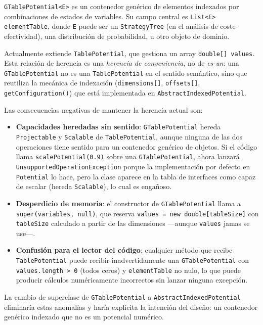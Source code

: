 \documentclass[11pt,a4paper]{article}
\newcommand{\code}[1]{\texttt{#1}}
\begin{document}
\code{GTablePotential<E>} es un contenedor genérico de elementos indexados
por combinaciones de estados de variables.  Su campo central es
\code{List<E> elementTable}, donde \code{E} puede ser un \code{StrategyTree}
(en el análisis de coste-efectividad), una distribución de probabilidad,
u otro objeto de dominio.

Actualmente extiende \code{TablePotential}, que gestiona un array
\code{double[]~values}.  Esta relación de herencia es una \emph{herencia de
conveniencia}, no de \emph{es-un}: una \code{GTablePotential} no es una
\code{TablePotential} en el sentido semántico, sino que reutiliza la
mecánica de indexación (\code{dimensions[]}, \code{offsets[]},
\code{getConfiguration()}) que está implementada en
\code{AbstractIndexedPotential}.

Las consecuencias negativas de mantener la herencia actual son:

\begin{itemize}
  \item \textbf{Capacidades heredadas sin sentido}: \code{GTablePotential}
        hereda \code{Projectable} y \code{Scalable} de \code{TablePotential},
        aunque ninguna de las dos operaciones tiene sentido para un contenedor
        genérico de objetos.  Si el código llama
        \code{scalePotential(0.9)} sobre una \code{GTablePotential},
        ahora lanzará \code{UnsupportedOperationException} porque la
        implementación por defecto en \code{Potential} lo hace, pero
        la clase aparece en la tabla de interfaces como capaz de escalar
        (hereda \code{Scalable}), lo cual es engañoso.

  \item \textbf{Desperdicio de memoria}: el constructor de
        \code{GTablePotential} llama a \code{super(variables, null)}, que
        reserva \code{values = new double[tableSize]} con
        \code{tableSize} calculado a partir de las dimensiones ---aunque
        \code{values} jamas se use---.

  \item \textbf{Confusión para el lector del código}: cualquier método
        que recibe \code{TablePotential} puede recibir inadvertidamente una
        \code{GTablePotential} con \code{values.length > 0} (todos ceros)
        y \code{elementTable} no nulo, lo que puede producir cálculos
        numéricamente incorrectos sin lanzar ninguna excepción.
\end{itemize}

La cambio de superclase de \code{GTablePotential} a \code{AbstractIndexedPotential}
eliminaría estas anomalías y haría explícita la intención del
diseño: un contenedor genérico indexado que no es un potencial numérico.
\end{document}

